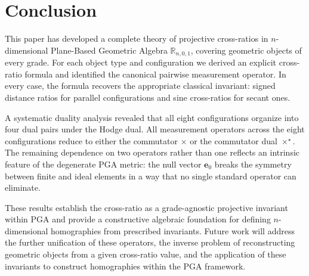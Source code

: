 \documentclass{birkjour}
\theoremstyle{definition}
\theoremstyle{remark}
\begin{document}


\section{Conclusion}
\label{sec:conclusion}

This paper has developed a complete theory of projective cross-ratios
in $n$-dimensional Plane-Based Geometric Algebra $\mathbb{R}_{n,0,1}$,
covering geometric objects of every grade. For each object type and
configuration we derived an explicit cross-ratio formula and
identified the canonical pairwise measurement operator. In every case,
the formula recovers the appropriate classical invariant: signed
distance ratios for parallel configurations and sine cross-ratios for
secant ones.

A systematic duality analysis revealed that all eight configurations
organize into four dual pairs under the Hodge dual.
All measurement operators across
the eight configurations reduce to either the commutator $\times$ or
the commutator dual $\times^\star$. The remaining dependence on two
operators rather than one reflects an intrinsic feature of the
degenerate PGA metric: the null vector $\mathbf{e}_0$ breaks the
symmetry between finite and ideal elements in a way that no single
standard operator can eliminate.

These results establish the cross-ratio as a grade-agnostic projective
invariant within PGA and provide a constructive algebraic foundation
for defining $n$-dimensional homographies from prescribed invariants.
Future work will address the further unification of these operators,
the inverse problem of reconstructing geometric objects from a given
cross-ratio value, and the application of these invariants to
construct homographies within the PGA framework.




\end{document}
